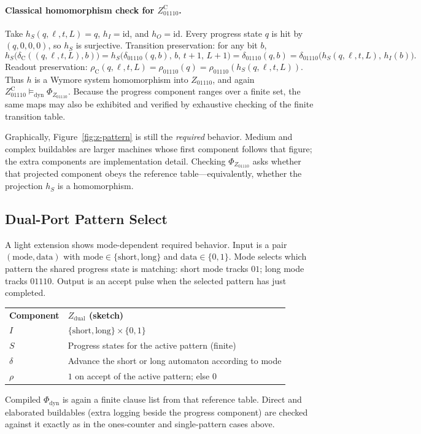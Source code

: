 \paragraph{Classical homomorphism check for $Z_{01110}^{\mathrm{C}}$.}
Take $h_S(q,\ell,t,L)=q$, $h_I=\mathrm{id}$, and $h_O=\mathrm{id}$. Every progress state $q$ is hit by $(q,0,0,0)$, so $h_S$ is surjective. Transition preservation: for any bit $b$,
\[
  h_S\bigl(\delta_{\mathrm{C}}((q,\ell,t,L),b)\bigr)
  = h_S\bigl(\delta_{01110}(q,b),\,b,\,t{+}1,\,L{+}1\bigr)
  = \delta_{01110}(q,b)
  = \delta_{01110}\bigl(h_S(q,\ell,t,L),\,h_I(b)\bigr).
\]
Readout preservation: $\rho_{\mathrm{C}}(q,\ell,t,L)=\rho_{01110}(q)=\rho_{01110}(h_S(q,\ell,t,L))$. Thus $h$ is a Wymore system homomorphism into $Z_{01110}$, and again $Z_{01110}^{\mathrm{C}}\models_{\mathrm{dyn}}\Phi_{Z_{01110}}$. Because the progress component ranges over a finite set, the same maps may also be exhibited and verified by exhaustive checking of the finite transition table.

Graphically, Figure~\ref{fig:z-pattern} is still the \emph{required} behavior. Medium and complex buildables are larger machines whose first component follows that figure; the extra components are implementation detail. Checking $\Phi_{Z_{01110}}$ asks whether that projected component obeys the reference table---equivalently, whether the projection $h_S$ is a homomorphism.

\subsection{Dual-Port Pattern Select}
\label{sec:case-dual}

A light extension shows mode-dependent required behavior. Input is a pair $(\mathrm{mode},\mathrm{data})$ with $\mathrm{mode}\in\{\mathrm{short},\mathrm{long}\}$ and $\mathrm{data}\in\{0,1\}$. Mode selects which pattern the shared progress state is matching: short mode tracks $01$; long mode tracks $01110$. Output is an accept pulse when the selected pattern has just completed.

\begingroup
\renewcommand{\arraystretch}{1.2}
\footnotesize
\begin{center}
\begin{tabularx}{0.78\linewidth}{@{}>{\raggedright\arraybackslash}p{2.8cm}Y@{}}
    \headingfont\bfseries Component & \headingfont\bfseries $Z_{\mathrm{dual}}$ (sketch) \\
    \addlinespace[2pt]
    $I$ & $\{\mathrm{short},\mathrm{long}\}\times\{0,1\}$ \\
    \addlinespace[2pt]
    $S$ & Progress states for the active pattern (finite) \\
    \addlinespace[2pt]
    $\delta$ & Advance the short or long automaton according to mode \\
    \addlinespace[2pt]
    $\rho$ & $1$ on accept of the active pattern; else $0$ \\
\end{tabularx}
\end{center}
\label{tab:z-dual}
\endgroup
\vspace{4pt}

Compiled $\Phi_{\mathrm{dyn}}$ is again a finite clause list from that reference table. Direct and elaborated buildables (extra logging beside the progress component) are checked against it exactly as in the ones-counter and single-pattern cases above.

